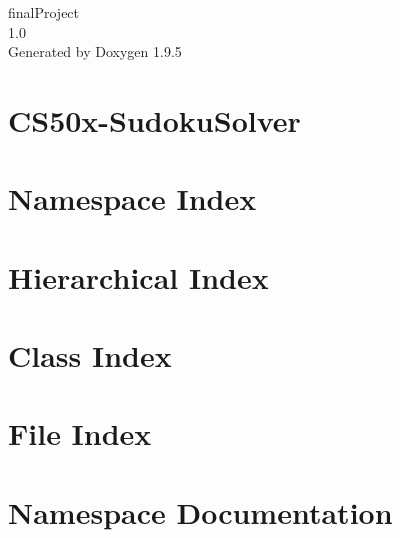 \documentclass[twoside]{book}
\newcommand{\+}{\discretionary{\mbox{\scriptsize$\hookleftarrow$}}{}{}}
\newcommand{\clearemptydoublepage}{%
    \newpage{\pagestyle{empty}\cleardoublepage}%
  }
\begin{document}
  \raggedbottom
    \hypersetup{pageanchor=false,
                bookmarksnumbered=true,
                pdfencoding=unicode
               }
  \begin{titlepage}
  \vspace*{7cm}
  \begin{center}%
  {\Large final\+Project}\\
  [1ex]\large 1.\+0 \\
  \vspace*{1cm}
  {\large Generated by Doxygen 1.9.5}\\
  \end{center}
  \end{titlepage}
  \clearemptydoublepage
  \tableofcontents
  \clearemptydoublepage
  \hypersetup{pageanchor=true}
\chapter{CS50x-\/\+Sudoku\+Solver}
\label{md__r_e_a_d_m_e}

\chapter{Namespace Index}

\chapter{Hierarchical Index}

\chapter{Class Index}

\chapter{File Index}

\chapter{Namespace Documentation}








\end{document}

